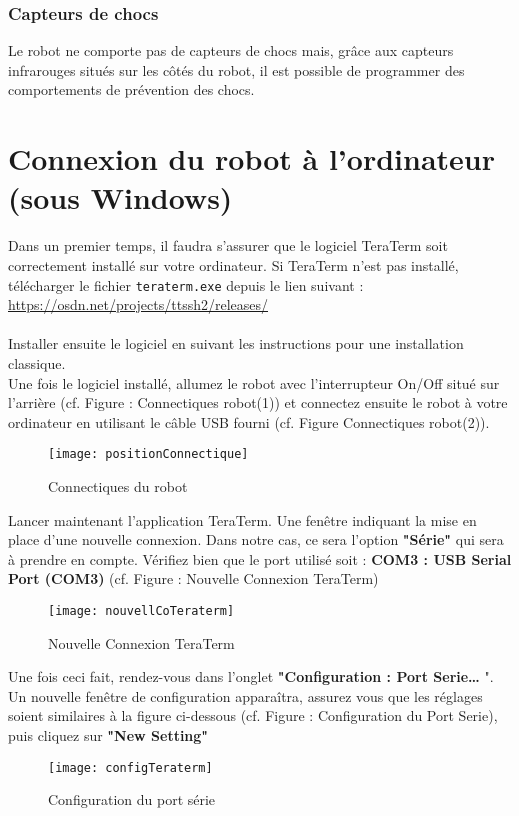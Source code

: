 \documentclass[11pt]{article} %
\begin{document}
\subsubsection{Capteurs de chocs}
Le robot ne comporte pas de capteurs de chocs mais, grâce aux capteurs infrarouges situés sur les côtés du robot, il est possible de programmer des comportements de prévention des chocs.
\pagebreak
\section{Connexion du robot à l'ordinateur (sous Windows)}
Dans un premier temps, il faudra s’assurer que le logiciel TeraTerm soit correctement installé sur votre ordinateur. Si TeraTerm n’est pas installé, télécharger le fichier \verb|teraterm.exe| depuis le lien suivant :\\
\url{https://osdn.net/projects/ttssh2/releases/}\\
\\
Installer ensuite le logiciel en suivant les instructions pour une installation classique.\\
Une fois le logiciel installé, allumez le robot avec l’interrupteur On/Off situé sur l’arrière (cf. Figure : Connectiques robot(1)) et connectez ensuite le robot à votre ordinateur en utilisant le câble USB fourni (cf. Figure Connectiques robot(2)).\\
\begin{figure}[H]
	\caption{Connectiques du robot}
	\texttt{[image: positionConnectique]}
\end{figure}
Lancer maintenant l’application TeraTerm. Une fenêtre indiquant la mise en place d’une nouvelle connexion. Dans notre cas, ce sera l’option \textbf{"Série"} qui sera à prendre en compte. Vérifiez bien que le port utilisé soit : \textbf{COM3 : USB Serial Port (COM3)} (cf. Figure : Nouvelle Connexion TeraTerm)
\begin{figure}[H]
	\caption{Nouvelle Connexion TeraTerm}
	\texttt{[image: nouvellCoTeraterm]}
\end{figure}
Une fois ceci fait, rendez-vous dans l’onglet \textbf{"Configuration : Port Serie… }". Un nouvelle fenêtre de configuration apparaîtra, assurez vous que les réglages soient similaires à la figure ci-dessous (cf. Figure : Configuration du Port Serie), puis cliquez sur  \textbf{"New Setting"}
\begin{figure}[H]
	\caption{Configuration du port série}
	\texttt{[image: configTeraterm]}
\end{figure}
\end{document}
